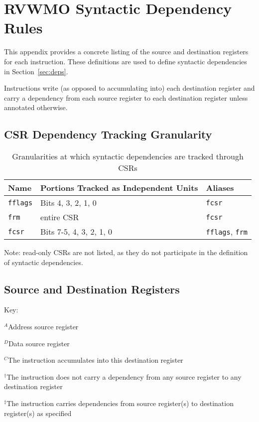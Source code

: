 \chapter{RVWMO Syntactic Dependency Rules}
\label{ch:deps}
This appendix provides a concrete listing of the source and destination registers for each instruction.
These definitions are used to define syntactic dependencies in Section~\ref{sec:deps}.

Instructions write (as opposed to accumulating into) each destination register and carry a dependency from each source register to each destination register unless annotated otherwise.

\section{CSR Dependency Tracking Granularity}

\begin{table}[h!]
  \centering
  \begin{tabular}{|l|l|l|}
    \hline
    Name & Portions Tracked as Independent Units & Aliases \\
    \hline
    {\tt fflags} & Bits 4, 3, 2, 1, 0 & {\tt fcsr}  \\
    \hline
    {\tt frm} & entire CSR & {\tt fcsr} \\
    \hline
    {\tt fcsr} & Bits 7-5, 4, 3, 2, 1, 0 & {\tt fflags}, {\tt frm} \\
    \hline
  \end{tabular}
  \caption{Granularities at which syntactic dependencies are tracked through CSRs}
\end{table}

Note: read-only CSRs are not listed, as they do not participate in the definition of syntactic dependencies.

\section{Source and Destination Registers}

Key:

$^A$Address source register

$^D$Data source register

$^C$The instruction accumulates into this destination register

$^\dagger$The instruction does not carry a dependency from any source register to any destination register

$^\ddagger$The instruction carries dependencies from source register(s) to destination register(s) as specified

